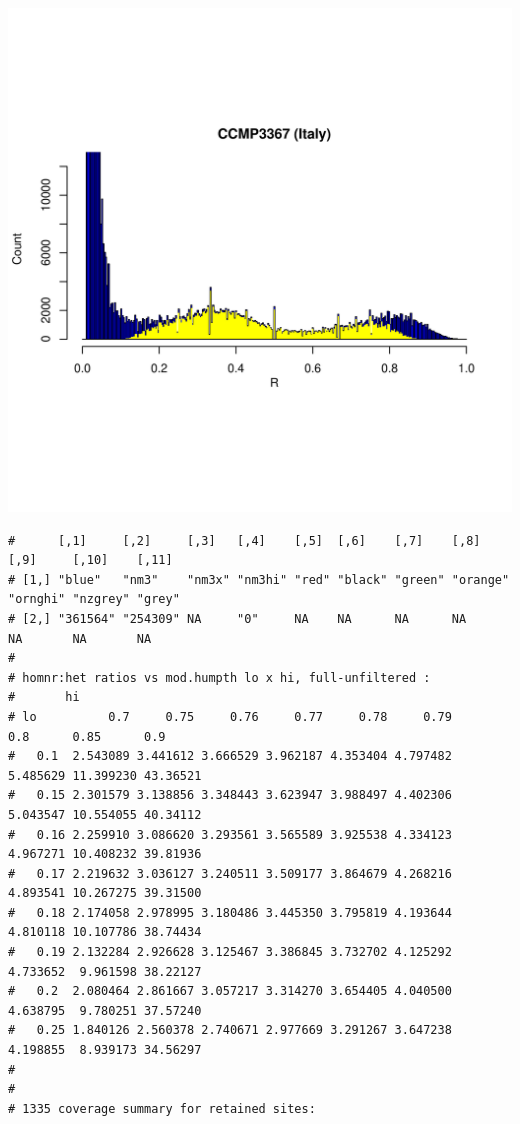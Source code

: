 \documentclass{article}\usepackage[]{graphicx}\usepackage[]{color}
\makeatletter
\def\maxwidth{ %
  \ifdim\Gin@nat@width>\linewidth
    \linewidth
  \else
    \Gin@nat@width
  \fi
}
\newenvironment{kframe}{%
 \def\at@end@of@kframe{}%
 \ifinner\ifhmode%
  \def\at@end@of@kframe{\end{minipage}}%
  \begin{minipage}{\columnwidth}%
 \fi\fi%
 \def\FrameCommand##1{\hskip\@totalleftmargin \hskip-\fboxsep
 \colorbox{shadecolor}{##1}\hskip-\fboxsep
     \hskip-\linewidth \hskip-\@totalleftmargin \hskip\columnwidth}%
 \MakeFramed {\advance\hsize-\width
   \@totalleftmargin\z@ \linewidth\hsize
   \@setminipage}}%
 {\par\unskip\endMakeFramed%
 \at@end@of@kframe}
\newenvironment{knitrout}{}{} %
\makeatother
\begin{document}
\begin{knitrout}
\includegraphics[width=\maxwidth]{FigS7-hwe-histo-figs-knitr/unnamed-chunk-10-11} 
\begin{kframe}\begin{verbatim}
#      [,1]     [,2]     [,3]   [,4]    [,5]  [,6]    [,7]    [,8]     [,9]     [,10]    [,11] 
# [1,] "blue"   "nm3"    "nm3x" "nm3hi" "red" "black" "green" "orange" "ornghi" "nzgrey" "grey"
# [2,] "361564" "254309" NA     "0"     NA    NA      NA      NA       NA       NA       NA
# 
# homnr:het ratios vs mod.humpth lo x hi, full-unfiltered :
#       hi
# lo          0.7     0.75     0.76     0.77     0.78     0.79      0.8      0.85      0.9
#   0.1  2.543089 3.441612 3.666529 3.962187 4.353404 4.797482 5.485629 11.399230 43.36521
#   0.15 2.301579 3.138856 3.348443 3.623947 3.988497 4.402306 5.043547 10.554055 40.34112
#   0.16 2.259910 3.086620 3.293561 3.565589 3.925538 4.334123 4.967271 10.408232 39.81936
#   0.17 2.219632 3.036127 3.240511 3.509177 3.864679 4.268216 4.893541 10.267275 39.31500
#   0.18 2.174058 2.978995 3.180486 3.445350 3.795819 4.193644 4.810118 10.107786 38.74434
#   0.19 2.132284 2.926628 3.125467 3.386845 3.732702 4.125292 4.733652  9.961598 38.22127
#   0.2  2.080464 2.861667 3.057217 3.314270 3.654405 4.040500 4.638795  9.780251 37.57240
#   0.25 1.840126 2.560378 2.740671 2.977669 3.291267 3.647238 4.198855  8.939173 34.56297
# 
# 
# 1335 coverage summary for retained sites:

\end{verbatim}
\end{kframe}
\end{knitrout}
\end{document}
